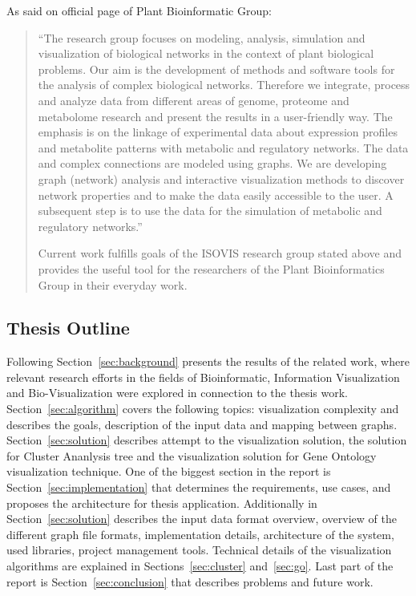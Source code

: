 As said on official page of Plant Bioinformatic Group:
\begin{quotation}
``The research group focuses on modeling, analysis, simulation and visualization of biological networks in the context of plant biological problems.
Our aim is the development of methods and software tools for the analysis of complex biological networks.
Therefore we integrate, process and analyze data from different areas of genome, proteome and metabolome research and present the results in a user-friendly way.
The emphasis is on the linkage of experimental data about expression profiles and metabolite patterns with metabolic and regulatory networks.
The data and complex connections are modeled using graphs. We are developing graph (network) analysis and interactive visualization methods to discover network properties and to make the data easily accessible to the user.
A subsequent step is to use the data for the simulation of metabolic and regulatory networks.''~\cite{PBG}

Current work fulfills goals of the ISOVIS research group stated above and provides the useful tool for the researchers of the Plant Bioinformatics Group in their everyday work.

\end{quotation}


\subsection{Thesis Outline}
\label{sec:structure}

Following Section~\ref{sec:background} presents the results of the related work, where relevant research efforts in the fields of Bioinformatic, Information Visualization and Bio-Visualization were explored in connection to the thesis work. Section~\ref{sec:algorithm} covers the following topics: visualization complexity and describes the goals, description of the input data and mapping between graphs. Section~\ref{sec:solution} describes attempt to the visualization solution, the solution for Cluster Ananlysis tree and the visualization solution for Gene Ontology visualization technique. One of the biggest section in the report is Section~\ref{sec:implementation} that determines the requirements, use cases, and proposes the architecture for thesis application.
Additionally in Section~\ref{sec:solution} describes the input data format overview, overview of the different graph file formats, implementation details, architecture of the system, used libraries, project management tools. Technical details of the visualization algorithms are explained in Sections~\ref{sec:cluster} and~\ref{sec:go}. Last part of the report is Section~\ref{sec:conclusion} that describes problems and future work.

